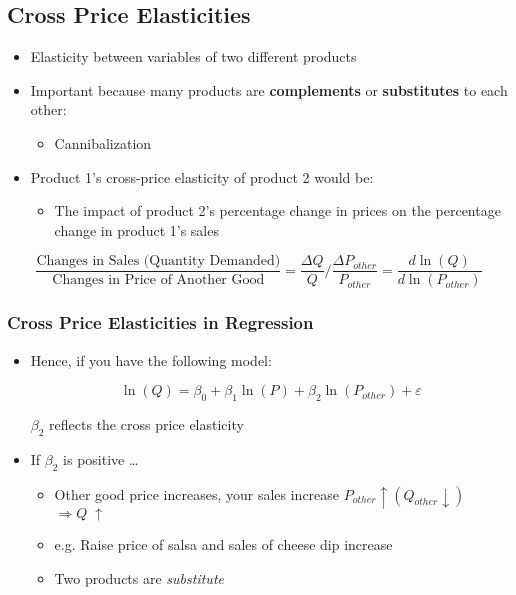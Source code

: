 \documentclass[10pt,article]{article}
\begin{document}
\subsection{Cross Price Elasticities}
\label{sec:org6d69206}
\begin{itemize}
\item Elasticity between variables of two different products

\item Important because many products are \textbf{complements} or \textbf{substitutes} to each
other:

\begin{itemize}
\item Cannibalization
\end{itemize}
\end{itemize}

\begin{itemize}
\item Product 1's cross-price elasticity of product 2 would be:

\begin{itemize}
\item The impact of product 2's percentage change in prices on the percentage
change in product 1's sales
\end{itemize}
\end{itemize}

\[ \dfrac{\text{Changes in Sales (Quantity Demanded)}}{\text{Changes in
Price of Another Good}} = \dfrac{\Delta Q}{Q} \Bigg/ \dfrac{\Delta
P_{other}}{P_{other}} = \dfrac{d \ln (Q)}{d \ln (P_{other})} \]
\subsubsection{Cross Price Elasticities in Regression}
\label{sec:org81b7963}
\begin{itemize}
\item Hence, if you have the following model:

\[ \ln(Q) = \beta_0 + \beta_1\ln(P) + \beta_2\ln(P_{other}) + \varepsilon \]

\(\beta_{2}\) reflects the cross price elasticity
\end{itemize}

\begin{itemize}
\item If \(\beta_2\) is positive \ldots{}
\begin{itemize}
\item Other good price increases, your sales  increase 
 \( P_{other} \uparrow (Q_{other} \downarrow) \)  \(\Rightarrow Q\;\uparrow \)
\item e.g. Raise price of salsa and sales of cheese dip increase
\item Two products are \emph{substitute}
\end{itemize}
\end{itemize}
\end{document}
